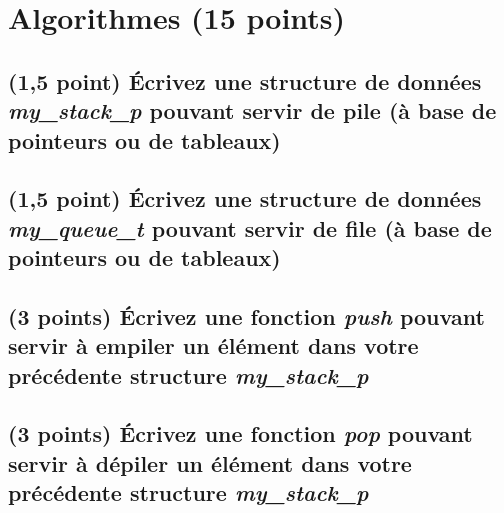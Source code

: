 \documentclass[11pt,a4paper]{article}
\begin{document}
\clearpage

\section{Algorithmes (15 points)}


\subsection{(1,5 point) \'Ecrivez une structure de données \og \textit{my\_stack\_p} \fg{} pouvant servir de pile (à base de pointeurs ou de tableaux) }

\bigskip

\begin{center}
\end{center}

\bigskip


\subsection{(1,5 point) \'Ecrivez une structure de données \og \textit{my\_queue\_t} \fg{} pouvant servir de file (à base de pointeurs ou de tableaux) }

\bigskip

\begin{center}
\end{center}



\newpage

\subsection{(3 points) \'Ecrivez une fonction \og \textit{push} \fg{} pouvant servir à empiler un élément dans votre précédente structure \og \textit{my\_stack\_p} \fg{} }

\bigskip

\begin{center}

\end{center}

\newpage

\subsection{(3 points) \'Ecrivez une fonction \og \textit{pop} \fg{} pouvant servir à dépiler un élément dans votre précédente structure \og \textit{my\_stack\_p} \fg{} }
\end{document}
